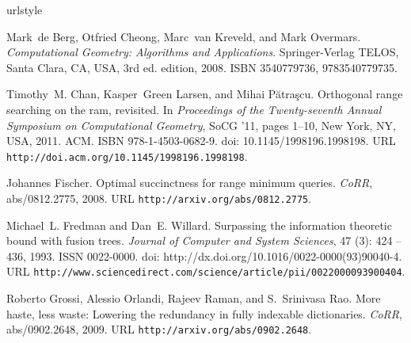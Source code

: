 \documentclass[twoside,11pt,openright]{report}
\begin{document}
 
\begin{thebibliography}{5}
\providecommand{\natexlab}[1]{#1}
\providecommand{\url}[1]{\texttt{#1}}
\expandafter\ifx\csname urlstyle\endcsname\relax
  \providecommand{\doi}[1]{doi: #1}\else
  \providecommand{\doi}{doi: \begingroup \urlstyle{rm}\Url}\fi

Mark~de Berg, Otfried Cheong, Marc~van Kreveld, and Mark Overmars.
\newblock \emph{Computational Geometry: Algorithms and Applications}.
\newblock Springer-Verlag TELOS, Santa Clara, CA, USA, 3rd ed. edition, 2008.
\newblock ISBN 3540779736, 9783540779735.

Timothy~M. Chan, Kasper~Green Larsen, and Mihai P\u{a}tra\c{s}cu.
\newblock Orthogonal range searching on the ram, revisited.
\newblock In \emph{Proceedings of the Twenty-seventh Annual Symposium on
  Computational Geometry}, SoCG '11, pages 1--10, New York, NY, USA, 2011. ACM.
\newblock ISBN 978-1-4503-0682-9.
\newblock \doi{10.1145/1998196.1998198}.
\newblock URL \url{http://doi.acm.org/10.1145/1998196.1998198}.

Johannes Fischer.
\newblock Optimal succinctness for range minimum queries.
\newblock \emph{CoRR}, abs/0812.2775, 2008.
\newblock URL \url{http://arxiv.org/abs/0812.2775}.

Michael~L. Fredman and Dan~E. Willard.
\newblock Surpassing the information theoretic bound with fusion trees.
\newblock \emph{Journal of Computer and System Sciences}, 47
  (3): 424 -- 436, 1993.
\newblock ISSN 0022-0000.
\newblock \doi{http://dx.doi.org/10.1016/0022-0000(93)90040-4}.
\newblock URL
  \url{http://www.sciencedirect.com/science/article/pii/0022000093900404}.

Roberto Grossi, Alessio Orlandi, Rajeev Raman, and S.~Srinivasa Rao.
\newblock More haste, less waste: Lowering the redundancy in fully indexable
  dictionaries.
\newblock \emph{CoRR}, abs/0902.2648, 2009.
\newblock URL \url{http://arxiv.org/abs/0902.2648}.

\end{thebibliography}
\end{document}
